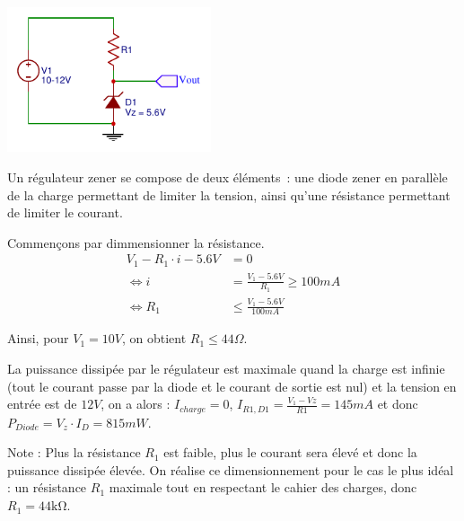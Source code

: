 \documentclass{../../template/tp}
\begin{document}

{%
\begin{center}
    \includegraphics[width=6cm]{corexzener}
\end{center}
Un régulateur zener se compose de deux éléments~: une diode zener en parallèle de la charge permettant de limiter la tension, ainsi qu'une résistance permettant de limiter le courant.

Commençons par dimmensionner la résistance.
\begin{align*}
V_1 - R_1 \cdot i - 5.6V & = 0 \\
\Leftrightarrow i & = \frac{V_1 - 5.6V}{R_1} \geq 100 mA \\
\Leftrightarrow R_1 & \leq \frac{V_1 - 5.6V}{100 mA}
\end{align*}

Ainsi, pour $V_1 = 10 V$, on obtient $R_1 \leq 44 \Omega$.


La puissance dissipée par le régulateur est maximale quand la charge est infinie (tout le courant passe par la diode et le courant de sortie est nul) et la tension en entrée est de $12V$, on a alors : $I_{charge}=0$, $I_{R1,D1} = \frac{V_1 - Vz}{R1} = 145mA$ et donc $P_{Diode} = V_z \cdot I_D = 815mW$.

Note : Plus la résistance $R_1$ est faible, plus le courant sera élevé et donc la puissance dissipée élevée. On réalise ce dimensionnement pour le cas le plus idéal : un résistance $R_1$ maximale tout en respectant le cahier des charges, donc $R_1 = 44 \si{\kohm}$.
}
\end{document}
